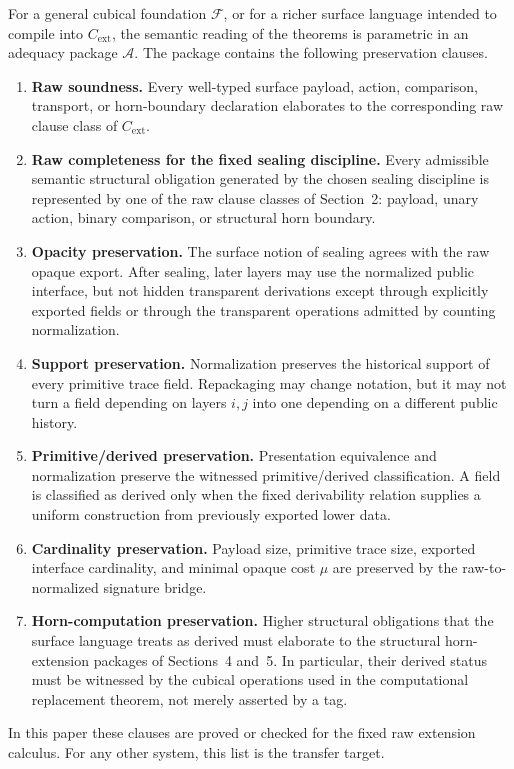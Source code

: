 \documentclass{lmcs}
\begin{document}
\begin{rem}
For a general cubical foundation \(\mathcal F\), or for a richer surface language intended to
compile into \(C_{\mathrm{ext}}\), the semantic reading of the theorems is parametric in an
adequacy package \(\mathcal A\).  The package contains the following preservation clauses.

\begin{enumerate}
\item \textbf{Raw soundness.}  Every well-typed surface payload, action, comparison,
transport, or horn-boundary declaration elaborates to the corresponding raw clause class of
\(C_{\mathrm{ext}}\).

\item \textbf{Raw completeness for the fixed sealing discipline.}  Every admissible semantic
structural obligation generated by the chosen sealing discipline is represented by one of the
raw clause classes of Section~2: payload, unary action, binary comparison, or structural horn
boundary.

\item \textbf{Opacity preservation.}  The surface notion of sealing agrees with the raw opaque
export.  After sealing, later layers may use the normalized public interface, but not hidden
transparent derivations except through explicitly exported fields or through the transparent
operations admitted by counting normalization.

\item \textbf{Support preservation.}  Normalization preserves the historical support of every
primitive trace field.  Repackaging may change notation, but it may not turn a field depending
on layers \(i,j\) into one depending on a different public history.

\item \textbf{Primitive/derived preservation.}  Presentation equivalence and normalization
preserve the witnessed primitive/derived classification.  A field is classified as derived
only when the fixed derivability relation supplies a uniform construction from previously
exported lower data.

\item \textbf{Cardinality preservation.}  Payload size, primitive trace size, exported
interface cardinality, and minimal opaque cost \(\mu\) are preserved by the raw-to-normalized
signature bridge.

\item \textbf{Horn-computation preservation.}  Higher structural obligations that the surface
language treats as derived must elaborate to the structural horn-extension packages of
Sections~4 and~5.  In particular, their derived status must be witnessed by the cubical
operations used in the computational replacement theorem, not merely asserted by a tag.

\end{enumerate}

In this paper these clauses are proved or checked for the fixed raw extension calculus.  For
any other system, this list is the transfer target.
\end{rem}
\end{document}

